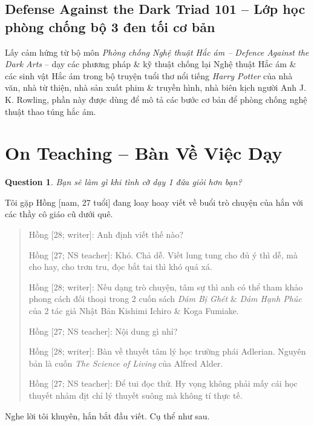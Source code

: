 \documentclass[12pt]{article}
\newtheorem{question}{Question}
\begin{document}
\subsection{Defense Against the Dark Triad 101 -- Lớp học phòng chống bộ 3 đen tối cơ bản}
Lấy cảm hứng từ bộ môn {\it Phòng chống Nghệ thuật Hắc ám -- Defence Against the Dark Arts} -- dạy các phương pháp \& kỹ thuật chống lại Nghệ thuật Hắc ám \& các sinh vật Hắc ám trong bộ truyện tuổi thơ nổi tiếng {\it Harry Potter} của nhà văn, nhà từ thiện, nhà sản xuất phim \& truyền hình, nhà biên kịch người Anh {\sc J. K. Rowling}, phần này được dùng để mô tả các bước cơ bản để phòng chống nghệ thuật thao túng hắc ám.


\section{On Teaching -- Bàn Về Việc Dạy}
\label{sect: teaching}

\begin{question}
	Bạn sẽ làm gì khi tình cờ dạy 1 đứa giỏi hơn bạn?
\end{question}
Tôi gặp Hồng [nam, 27 tuổi] đang loay hoay viết về buổi trò chuyện của hắn với các thầy cô giáo cũ dưới quê.

\begin{quote}
	{\sf Hồng [28; writer]}: Anh định viết thế nào?
	
	{\sf Hồng [27; NS teacher]}: Khó. Chả dễ. Viết lung tung cho đủ ý thì dễ, mà cho hay, cho trơn tru, đọc bắt tai thì khó quá xá.
	
	{\sf Hồng [28; writer]}: Nếu dạng trò chuyện, tâm sự thì anh có thể tham khảo phong cách đối thoại trong 2 cuốn sách {\it Dám Bị Ghét} \cite{Ichiro_Fumitake2022a} \& {\it Dám Hạnh Phúc} \cite{Ichiro_Fumitake2022b} của 2 tác giả Nhật Bản {\sc Kishimi Ichiro \& Koga Fumiake}.
	
	{\sf Hồng [27; NS teacher]}: Nội dung gì nhỉ?
	
	{\sf Hồng [28; writer]}: Bàn về thuyết tâm lý học trường phái Adlerian. Nguyên bản là cuốn {\it The Science of Living} \cite{Adler2013} của {\sc Alfred Alder}.
	
	{\sf Hồng [27; NS teacher]}: Để tui đọc thử. Hy vọng không phải mấy cái học thuyết nhảm địt chỉ lý thuyết suông mà không tí thực tế.
\end{quote}

Nghe lời tôi khuyên, hắn bắt đầu viết. Cụ thể như sau.
\end{document}
